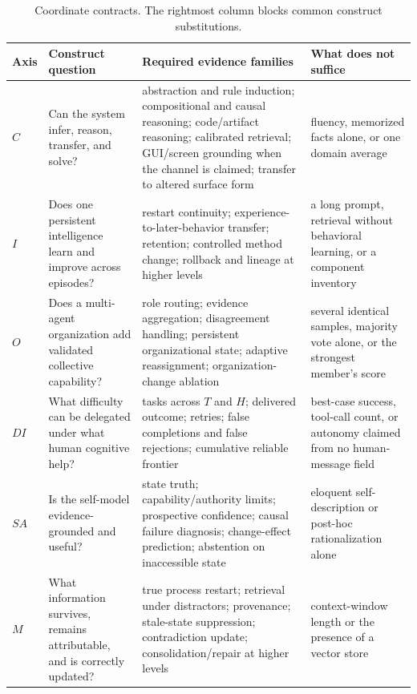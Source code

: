 \documentclass[11pt]{article}
\theoremstyle{definition}
\begin{document}
\begin{table}[H]
\centering\scriptsize
\begin{tabularx}{\textwidth}{@{}p{}p{}YY@{}}
\toprule
Axis & Construct question & Required evidence families & What does not suffice \\
\midrule
$C$ & Can the system infer, reason, transfer, and solve? & abstraction and rule induction; compositional and causal reasoning; code/artifact reasoning; calibrated retrieval; GUI/screen grounding when the channel is claimed; transfer to altered surface form & fluency, memorized facts alone, or one domain average \\
$I$ & Does one persistent intelligence learn and improve across episodes? & restart continuity; experience-to-later-behavior transfer; retention; controlled method change; rollback and lineage at higher levels & a long prompt, retrieval without behavioral learning, or a component inventory \\
$O$ & Does a multi-agent organization add validated collective capability? & role routing; evidence aggregation; disagreement handling; persistent organizational state; adaptive reassignment; organization-change ablation & several identical samples, majority vote alone, or the strongest member's score \\
$DI$ & What difficulty can be delegated under what human cognitive help? & tasks across $T$ and $H$; delivered outcome; retries; false completions and false rejections; cumulative reliable frontier & best-case success, tool-call count, or autonomy claimed from no human-message field \\
$SA$ & Is the self-model evidence-grounded and useful? & state truth; capability/authority limits; prospective confidence; causal failure diagnosis; change-effect prediction; abstention on inaccessible state & eloquent self-description or post-hoc rationalization alone \\
$M$ & What information survives, remains attributable, and is correctly updated? & true process restart; retrieval under distractors; provenance; stale-state suppression; contradiction update; consolidation/repair at higher levels & context-window length or the presence of a vector store \\
\bottomrule
\end{tabularx}
\caption{Coordinate contracts. The rightmost column blocks common construct substitutions.}
\label{tab:coordinates}
\end{table}
\end{document}
